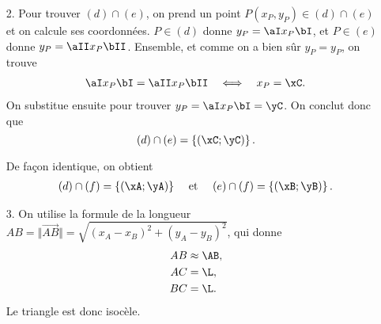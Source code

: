 {	\begin{enumerate}
		\item[2.] Pour trouver $(d) \cap (e)$, on prend un point $P(x_P, y_P) \in (d) \cap (e)$ et on calcule ses coordonnées.
		$P \in (d)$ donne $y_P = \aI x_P \bI$, et $P \in (e)$ donne $y_P = \aII x_P \bII$.
		Ensemble, et comme on a bien sûr $y_P = y_P$, on trouve
			\begin{align*}
				\aI x_P \bI = \aII x_P \bII && \iff && x_P = \xC.
			\end{align*}
		On substitue ensuite pour trouver $y_P = \aI x_P \bI = \yC$.
		On conclut donc que
			\[ (d) \cap (e) = \left\{ \left( \xC ; \yC \right) \right\}. \]
			
		De façon identique, on obtient
			\begin{align*}
				(d) \cap (f) = \left\{ \left( \xA ; \yA \right) \right\} && \text{ et } && (e) \cap (f) =  \left\{ \left( \xB ; \yB \right) \right\}.
			\end{align*}
			
		\item[3.]
			On utilise la formule de la longueur $AB = \Vert \vec{AB} \Vert = \sqrt{(x_A - x_B)^2 + (y_A -y_B)^2}$, qui donne
			\begin{align*}
				AB &\approx \AB, \\
				AC &= \L, \\
				BC &= \L.
			\end{align*}
		Le triangle est donc isocèle.
	\end{enumerate}
}


